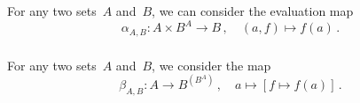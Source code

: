 \subsection{}



\subsubsection{}

For any two sets~$A$ and~$B$, we can consider the evaluation map
\[
	α_{A, B}
	\colon
	A × B^A \to B \,,
	\quad
	(a, f) \mapsto f(a) \,.
\]



\subsubsection{}

For any two sets~$A$ and~$B$, we consider the map
\[
	β_{A, B}
	\colon
	A \to B^{(B^A)} \,,
	\quad
	a \mapsto [f \mapsto f(a)] \,.
\]
